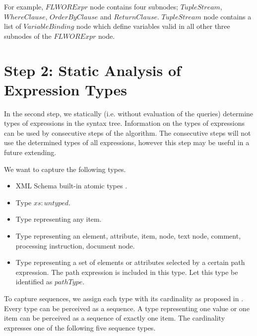 For example, $FLWORExpr$ node contains four subnodes; $TupleStream$, $WhereClause$, $OrderByClause$ and $ReturnClause$. $TupleStream$ node contains a list of $VariableBinding$ node which define variables valid in all other three subnodes of the $FLWORExpr$ node.


\section{Step 2: Static Analysis of Expression Types}
In the second step, we statically (i.e. without evaluation of the queries) determine types of expressions in the syntax tree. Information on the types of expressions can be used by consecutive steps of the algorithm. The consecutive steps will not use the determined types of all expressions, however this step may be useful in a future extending.


We want to capture the following types.

\begin{itemize}
\item XML Schema built-in atomic types .
\item Type $xs:untyped$. 
\item Type representing any item. 
\item Type representing an element, attribute, item, node, text node, comment, processing instruction, document node.
\item Type representing a set of elements or attributes selected by a certain path expression. The path expression is included in this type. Let this type be identified as $pathType$.
\end{itemize}


To capture sequences, we assign each type with its cardinality as proposed in . Every type can be perceived as a sequence. A type representing one value or one item can be perceived as a sequence of exactly one item. The cardinality expresses one of the following five sequence types.


